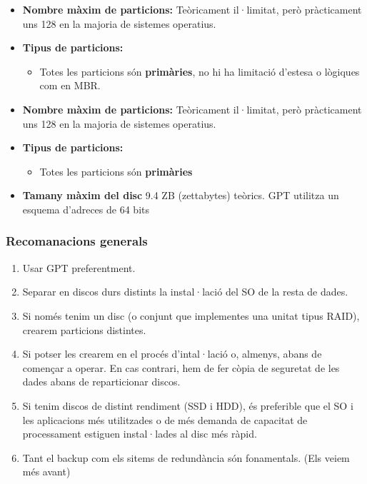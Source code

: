 \documentclass[
  a4paper,
]{article}
\providecommand{\tightlist}{%
  \setlength{\itemsep}{0pt}\setlength{\parskip}{0pt}}
\begin{document}
\begin{itemize}
\tightlist
\item
  \textbf{Nombre màxim de particions:} Teòricament il·limitat, però
  pràcticament uns 128 en la majoria de sistemes operatius.
\item
  \textbf{Tipus de particions:}

  \begin{itemize}
  \tightlist
  \item
    Totes les particions són \textbf{primàries}, no hi ha limitació
    d'estesa o lògiques com en MBR.
  \end{itemize}
\item
  \textbf{Nombre màxim de particions:} Teòricament il·limitat, però
  pràcticament uns 128 en la majoria de sistemes operatius.
\item
  \textbf{Tipus de particions:}

  \begin{itemize}
  \tightlist
  \item
    Totes les particions són \textbf{primàries}
  \end{itemize}
\item
  \textbf{Tamany màxim del disc} 9.4 ZB (zettabytes) teòrics. GPT
  utilitza un esquema d'adreces de 64 bits
\end{itemize}

\subsubsection{Recomanacions generals}\label{recomanacions-generals}

\begin{enumerate}
\def\labelenumi{\arabic{enumi}.}
\tightlist
\item
  Usar GPT preferentment.
\item
  Separar en discos durs distints la instal·lació del SO de la resta de
  dades.
\item
  Si només tenim un disc (o conjunt que implementes una unitat tipus
  RAID), crearem particions distintes.
\item
  Si potser les crearem en el procés d'intal·lació o, almenys, abans de
  començar a operar. En cas contrari, hem de fer còpia de seguretat de
  les dades abans de reparticionar discos.
\item
  Si tenim discos de distint rendiment (SSD i HDD), és preferible que el
  SO i les aplicacions més utilitzades o de més demanda de capacitat de
  processament estiguen instal·lades al disc més ràpid.
\item
  Tant el backup com els sitems de redundància són fonamentals. (Els
  veiem més avant)
\end{enumerate}
\end{document}
